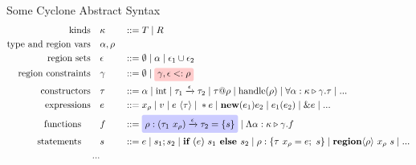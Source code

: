 \documentclass[aspectratio=169]{beamer}
\begin{document}
\begin{frame}{Some Cyclone Abstract Syntax}
\scriptsize{
\begin{alignat*}{2}
\text{kinds}\quad &\kappa &&::= T \altm R
\\
\text{type and region vars}\quad &\alpha,\rho &&
\\
\text{region sets}\quad &\epsilon &&::= \emptyset \altm \alpha \altm \epsilon_1 \cup \epsilon_2
\\
\text{region constraints} \quad &\gamma &&::= \emptyset \altm \colorIt{red}{n1}{\gamma, \epsilon <: \rho}
\\
\text{constructors} \quad &\tau &&::= \alpha \altm \text{int} \altm \tau_1 \xrightarrow[]{\epsilon} \tau_2 \altm \tau @ \rho \altm \text{handle}(\rho) \altm \forall\alpha:\kappa \triangleright \gamma.\tau \altm ...
\\
\text{expressions} \quad &e &&::= x_\rho \altm v \altm e\ \langle\tau\rangle \altm \ast e \altm \textbf{new}(e_1)e_2 \altm e_1(e_2) \altm \&e \altm ...
\\
\text{functions} \qquad &f &&::= \colorIt{blue}{n2}{\rho:(\tau_1\ x_{\rho}) \xrightarrow[]{\epsilon} \tau_2 = \{s\}} \altm \Lambda\alpha:\kappa \triangleright \gamma.f
\\
\text{statements} \qquad &s &&::= e \altm s_1;s_2 \altm \textbf{if } (e)\ s_1 \textbf{ else } s_2 \altm \rho:\{\tau\ x_\rho = e;\ s\} \altm \textbf{region}\langle\rho\rangle\ x_{\rho}\ s \altm ...
\\
...
\end{alignat*}
    }
\end{frame}
\end{document}

